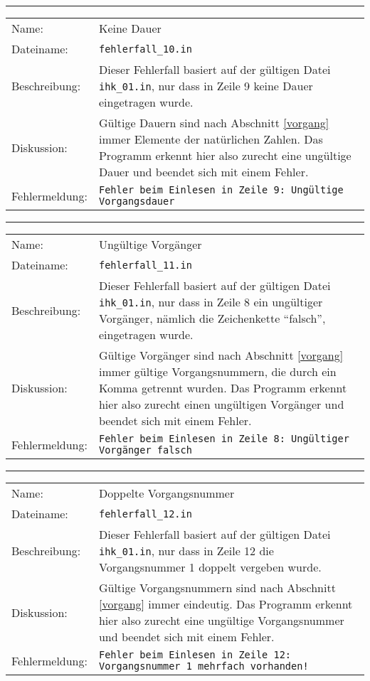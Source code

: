 \hrule
\begin{tabularx}{\textwidth}{l X}
  Name: & Keine Dauer \\
  Dateiname: & \texttt{fehlerfall\_10.in} \\
  Beschreibung: & Dieser Fehlerfall basiert auf der g\"ultigen Datei
  \texttt{ihk\_01.in}, nur dass in Zeile 9 keine Dauer
  eingetragen wurde. \\
  Diskussion: & G\"ultige Dauern sind nach Abschnitt
  \ref{vorgang} immer Elemente der nat\"urlichen Zahlen. Das Programm
  erkennt hier also zurecht eine ung\"ultige Dauer und beendet
  sich mit einem Fehler.\\
  Fehlermeldung: & \texttt{Fehler beim Einlesen in Zeile 9: Ungültige Vorgangsdauer} \\
\end{tabularx}
\hrule
\begin{tabularx}{\textwidth}{l X}
  Name: & Ung\"ultige Vorg\"anger \\
  Dateiname: & \texttt{fehlerfall\_11.in} \\
  Beschreibung: & Dieser Fehlerfall basiert auf der g\"ultigen Datei
  \texttt{ihk\_01.in}, nur dass in Zeile 8 ein ung\"ultiger
  Vorg\"anger, n\"amlich die Zeichenkette ``falsch'',
  eingetragen wurde. \\
  Diskussion: & G\"ultige Vorg\"anger sind nach Abschnitt
  \ref{vorgang} immer g\"ultige Vorgangsnummern, die durch ein Komma
  getrennt wurden. Das Programm erkennt hier also zurecht einen
  ung\"ultigen Vorg\"anger und beendet sich mit einem Fehler.\\
  Fehlermeldung: & \texttt{Fehler beim Einlesen in Zeile 8: Ungültiger
    Vorgänger falsch} \\
\end{tabularx}
\hrule
\begin{tabularx}{\textwidth}{l X}
  Name: & Doppelte Vorgangsnummer \\
  Dateiname: & \texttt{fehlerfall\_12.in} \\
  Beschreibung: & Dieser Fehlerfall basiert auf der g\"ultigen Datei
  \texttt{ihk\_01.in}, nur dass in Zeile 12 die Vorgangsnummer 1
  doppelt vergeben wurde. \\
  Diskussion: & G\"ultige Vorgangsnummern sind nach Abschnitt
  \ref{vorgang} immer eindeutig. Das Programm erkennt hier also
  zurecht eine ung\"ultige Vorgangsnummer und beendet sich mit einem
  Fehler.\\
  Fehlermeldung: & \texttt{Fehler beim Einlesen in Zeile 12:
    Vorgangsnummer 1 mehrfach vorhanden!} \\
\end{tabularx}
